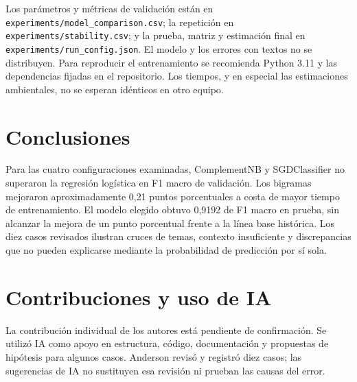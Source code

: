 \documentclass[conference]{IEEEtran}
\begin{document}
Los parámetros y métricas de validación están en
\texttt{experiments/model\_comparison.csv}; la repetición en
\texttt{experiments/stability.csv}; y la prueba, matriz y estimación
final en \texttt{experiments/run\_config.json}. El modelo y los
errores con textos no se distribuyen. Para reproducir el
entrenamiento se recomienda Python 3.11 y las dependencias
fijadas en el repositorio. Los tiempos, y en especial las
estimaciones ambientales, no se esperan idénticos en otro equipo.

\section{Conclusiones}
Para las cuatro configuraciones examinadas, ComplementNB y
SGDClassifier no superaron la regresión logística en F1 macro
de validación. Los bigramas mejoraron aproximadamente 0,21
puntos porcentuales a costa de mayor tiempo de entrenamiento.
El modelo elegido obtuvo 0,9192 de F1 macro en prueba, sin
alcanzar la mejora de un punto porcentual frente a la línea base
histórica. Los diez casos revisados ilustran cruces de temas,
contexto insuficiente y discrepancias que no pueden explicarse
mediante la probabilidad de predicción por sí sola.

\section*{Contribuciones y uso de IA}
La contribución individual de los autores está pendiente de
confirmación. Se utilizó IA como apoyo en estructura, código,
documentación y propuestas de hipótesis para algunos casos.
Anderson revisó y registró diez casos; las sugerencias de IA
no sustituyen esa revisión ni prueban las causas del error.
\end{document}

